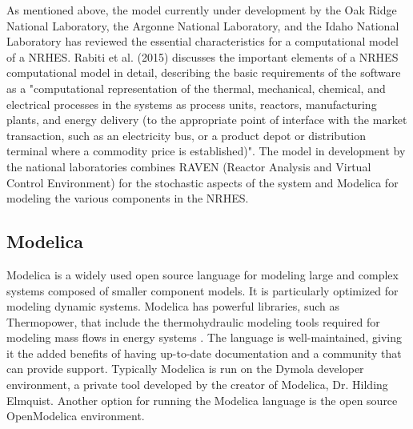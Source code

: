\documentclass{article}                                                                           %
\begin{document}
\begin{linenumbers}
As mentioned above, the model currently under development by the Oak Ridge National Laboratory, the Argonne National Laboratory, and the Idaho National Laboratory has reviewed the essential characteristics for a computational model of a NRHES. Rabiti et al. (2015) discusses the important elements of a NRHES computational model in detail, describing the basic requirements of the software as a "computational representation of the thermal, mechanical, chemical, and electrical processes in the systems as process units, reactors, manufacturing plants, and energy delivery (to the appropriate point of interface with the market transaction, such as an electricity bus, or a product depot or distribution terminal where a commodity price is established)"\cite{Rabiti2015}. The model in development by the national laboratories combines RAVEN (Reactor Analysis and Virtual Control Environment) for the stochastic aspects of the system and Modelica for modeling the various components in the NRHES.

\subsection{Modelica}
Modelica is a widely used open source language for modeling large and complex systems composed of smaller component models. It is particularly optimized for modeling dynamic systems. Modelica has powerful libraries, such as Thermopower, that include the thermohydraulic modeling tools required for modeling mass flows in energy systems \cite{Binder2014}. The language is well-maintained, giving it the added benefits of having up-to-date documentation and a community that can provide support. Typically Modelica is run on the Dymola developer environment, a private tool developed by the creator of Modelica, Dr. Hilding Elmquist. Another option for running the Modelica language is the open source OpenModelica environment.


\end{linenumbers}
\end{document}
